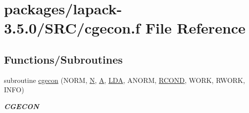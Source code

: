 \hypertarget{cgecon_8f}{}\section{packages/lapack-\/3.5.0/\+S\+R\+C/cgecon.f File Reference}
\label{cgecon_8f}
\subsection*{Functions/\+Subroutines}
\begin{DoxyCompactItemize}
\item 
subroutine \hyperlink{group__complexGEcomputational_gaa2ad4e4b1c9cb56a23dd49a798aa9bc8}{cgecon} (N\+O\+R\+M, \hyperlink{polmisc_8c_a0240ac851181b84ac374872dc5434ee4}{N}, \hyperlink{classA}{A}, \hyperlink{example__user_8c_ae946da542ce0db94dced19b2ecefd1aa}{L\+D\+A}, A\+N\+O\+R\+M, \hyperlink{superlu__enum__consts_8h_af00a42ecad444bbda75cde1b64bd7e72a9b5c151728d8512307565994c89919d5}{R\+C\+O\+N\+D}, W\+O\+R\+K, R\+W\+O\+R\+K, I\+N\+F\+O)
\begin{DoxyCompactList}\small\item\em {\bfseries C\+G\+E\+C\+O\+N} \end{DoxyCompactList}\end{DoxyCompactItemize}
